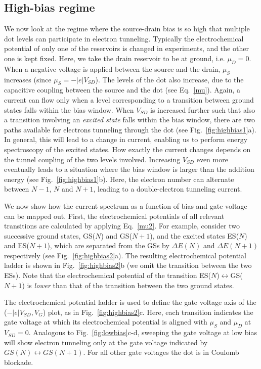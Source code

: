 \documentclass[12pt,aps,nofootinbib]{revtex4-1}
\begin{document}
\subsection{High-bias regime}
We now look at the regime where the source-drain bias is so high
that multiple dot levels can participate in electron tunneling.
Typically the electrochemical potential of only one of the
reservoirs is changed in experiments, and the other one is kept
fixed. Here, we take the drain reservoir to be at ground, i.e.
$\mu_D=0$. When a negative voltage is applied between the source
and the drain, $\mu_S$ increases (since $\mu_S= -\left|e\right|
V_{SD}$). The levels of the dot also increase, due to the
capacitive coupling between the source and the dot (see
Eq.~\ref{mu}). Again, a current can flow only when a level
corresponding to a transition between ground states falls within
the bias window. When $V_{SD}$ is increased further such that also
a transition involving an \textit{excited state} falls within the
bias window, there are two paths available for electrons tunneling
through the dot (see Fig.~\ref{fig:highbias1}a). In general, this
will lead to a change in current, enabling us to perform energy
spectroscopy of the excited states. How exactly the current
changes depends on the tunnel coupling of the two levels involved.
Increasing $V_{SD}$ even more eventually leads to a situation
where the bias window is larger than the addition energy (see
Fig.~\ref{fig:highbias1}b). Here, the electron number can
alternate between $N-1$, $N$ and $N\!+\!1$, leading to a
double-electron tunneling current.

We now show how the current spectrum as a function of bias and
gate voltage can be mapped out. First, the electrochemical
potentials of all relevant transitions are calculated by applying
Eq.~\ref{mu2}. For example, consider two successive ground
states, GS($N$) and GS($N\!+\!1$), and the excited states ES($N$)
and ES($N\!+\!1$), which are separated from the GSs by $\Delta
E(N)$ and $\Delta E(N\!+\!1)$ respectively (see
Fig.~\ref{fig:highbias2}a). The resulting electrochemical
potential ladder is shown in Fig.~\ref{fig:highbias2}b (we omit
the transition between the two ESs). Note that the electrochemical
potential of the transition ES($N$)$\leftrightarrow$GS($N\!+\!1$)
is \textit{lower} than that of the transition between the two
ground states.

The electrochemical potential ladder is used to define the gate
voltage axis of the ($-\left|e\right|V_{SD},{V_G}$) plot, as in
Fig.~\ref{fig:highbias2}c. Here, each transition indicates the
gate voltage at which its electrochemical potential is aligned
with $\mu_S$ and $\mu_D$ at $V_{SD}=0$. Analogous to
Fig.~\ref{fig:lowbias}c-d, sweeping the gate voltage at low bias
will show electron tunneling only at the gate voltage indicated by
$GS(N)\leftrightarrow GS(N\!+\!1)$. For all other gate voltages
the dot is in Coulomb blockade.
\end{document}

